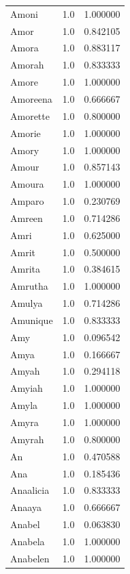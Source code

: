 \documentclass[
  letterpaper,
  DIV=11,
  numbers=noendperiod]{scrreprt}
\begin{document}
\begin{tabular}{lrr}
Amoni           &   1.0 &   1.000000 \\
Amor            &   1.0 &   0.842105 \\
Amora           &   1.0 &   0.883117 \\
Amorah          &   1.0 &   0.833333 \\
Amore           &   1.0 &   1.000000 \\
Amoreena        &   1.0 &   0.666667 \\
Amorette        &   1.0 &   0.800000 \\
Amorie          &   1.0 &   1.000000 \\
Amory           &   1.0 &   1.000000 \\
Amour           &   1.0 &   0.857143 \\
Amoura          &   1.0 &   1.000000 \\
Amparo          &   1.0 &   0.230769 \\
Amreen          &   1.0 &   0.714286 \\
Amri            &   1.0 &   0.625000 \\
Amrit           &   1.0 &   0.500000 \\
Amrita          &   1.0 &   0.384615 \\
Amrutha         &   1.0 &   1.000000 \\
Amulya          &   1.0 &   0.714286 \\
Amunique        &   1.0 &   0.833333 \\
Amy             &   1.0 &   0.096542 \\
Amya            &   1.0 &   0.166667 \\
Amyah           &   1.0 &   0.294118 \\
Amyiah          &   1.0 &   1.000000 \\
Amyla           &   1.0 &   1.000000 \\
Amyra           &   1.0 &   1.000000 \\
Amyrah          &   1.0 &   0.800000 \\
An              &   1.0 &   0.470588 \\
Ana             &   1.0 &   0.185436 \\
Anaalicia       &   1.0 &   0.833333 \\
Anaaya          &   1.0 &   0.666667 \\
Anabel          &   1.0 &   0.063830 \\
Anabela         &   1.0 &   1.000000 \\
Anabelen        &   1.0 &   1.000000 \\

\end{tabular}
\end{document}
